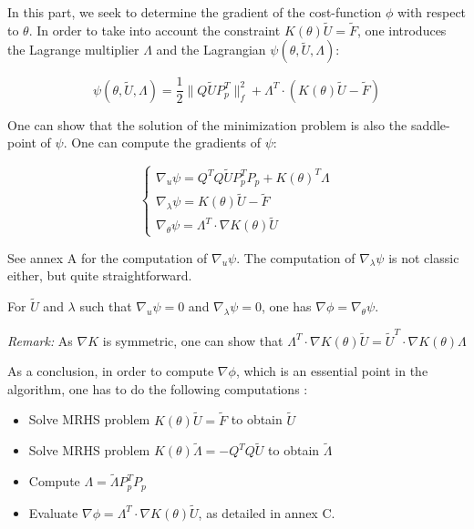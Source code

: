 \documentclass[11pt,a4paper]{article}  %
\begin{document}
In this part, we seek to determine the gradient of the cost-function $\phi$ with respect to $\theta$. In order to take into account the constraint $K(\theta)\tilde{U} = \tilde{F}$, one introduces the Lagrange multiplier $\Lambda$ and the Lagrangian $\psi(\theta,\tilde{U},\Lambda)$:

\begin{equation}
\psi(\theta,\tilde{U},\Lambda) = \dfrac{1}{2} \|Q\tilde{U}P_p^T\|_f^2 + \Lambda^T \cdot \left( K(\theta)\tilde{U} - \tilde{F} \right)
\end{equation}

One can show that the solution of the minimization problem is also the saddle-point of $\psi$. One can compute the gradients of $\psi$:

\begin{equation}
\begin{cases}
\nabla_u \psi = Q^TQ\tilde{U}P_p^TP_p + K(\theta)^T \Lambda \\
\nabla_\lambda \psi = K(\theta)\tilde{U} - \tilde{F} \\
\nabla_\theta \psi = \Lambda^T \cdot \nabla K(\theta) \tilde{U}
\end{cases}
\end{equation}

See annex A for the computation of $\nabla_u \psi$. The computation of $\nabla_\lambda \psi$ is not classic either, but quite straightforward.

For $\tilde{U}$ and $\lambda$ such that $\nabla_u \psi = 0$ and $\nabla_\lambda \psi = 0$, one has $\nabla\phi = \nabla_\theta \psi$.

\textit{Remark:} As $\nabla K$ is symmetric, one can show that $\Lambda^T \cdot \nabla K(\theta) \tilde{U} = \tilde{U}^T \cdot \nabla K(\theta) \Lambda$

As a conclusion, in order to compute $\nabla\phi$, which is an essential point in the algorithm, one has to do the following computations :

\begin{itemize}
   \item Solve MRHS problem $K(\theta)\tilde{U} = \tilde{F}$ to obtain $\tilde{U}$
   \item Solve MRHS problem $K(\theta) \tilde{\Lambda} = - Q^TQ\tilde{U}$ to obtain $\tilde{\Lambda}$
   \item Compute $\Lambda = \tilde{\Lambda}P_p^TP_p$
   \item Evaluate $\nabla\phi = \Lambda^T \cdot \nabla K(\theta) \tilde{U}$, as detailed in annex C.
\end{itemize}
\end{document}
